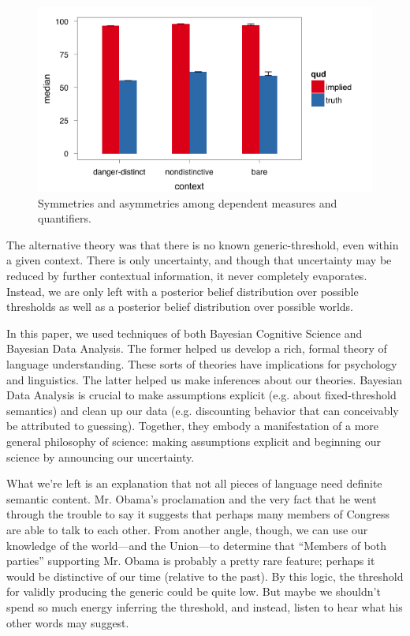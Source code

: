 \documentclass[10pt,letterpaper]{article}
\begin{document}
\begin{figure}
\centering
    \includegraphics[width=\columnwidth]{asymmetry_byContext_condTwice}
    \caption{Symmetries and asymmetries among dependent measures and quantifiers.}
  \label{fig:asymmetry}
\end{figure}

The alternative theory was that there is no known generic-threshold, even within a given context. There is only uncertainty, and though that uncertainty may be reduced by further contextual information, it never completely evaporates. Instead, we are only left with a posterior belief distribution over possible thresholds as well as a posterior belief distribution over possible worlds. 

In this paper, we used techniques of both Bayesian Cognitive Science and Bayesian Data Analysis. The former helped us develop a rich, formal theory of language understanding. These sorts of theories have implications for psychology and linguistics. The latter helped us make inferences about our theories. Bayesian Data Analysis is crucial to make assumptions explicit (e.g. about fixed-threshold semantics) and clean up our data (e.g. discounting behavior that can conceivably be attributed to guessing). Together, they embody a manifestation of a more general philosophy of science: making assumptions explicit and beginning our science by announcing our uncertainty.

What we're left is an explanation that not all pieces of language need definite semantic content. Mr. Obama's proclamation and the very fact that he went through the trouble to say it suggests that perhaps many members of Congress are able to talk to each other. From another angle, though, 
we can use our knowledge of the world---and the Union---to determine that ``Members of both parties'' supporting Mr. Obama is probably a pretty rare feature; perhaps it would be distinctive of our time (relative to the past). By this logic, the threshold for validly producing the generic could be quite low.  But maybe we shouldn't spend so much energy inferring the threshold, and instead, listen to hear what his other words may suggest.
\end{document}
